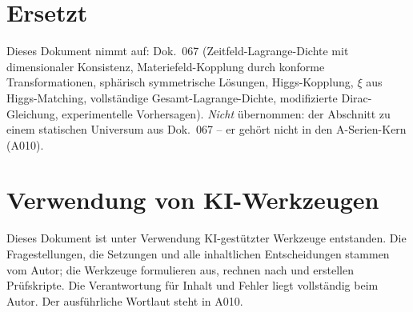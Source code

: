 \section{Ersetzt}

Dieses Dokument nimmt auf: Dok.~067 (Zeitfeld-Lagrange-Dichte mit dimensionaler
Konsistenz, Materiefeld-Kopplung durch konforme Transformationen, sphärisch
symmetrische Lösungen, Higgs-Kopplung, $\xi$ aus Higgs-Matching, vollständige
Gesamt-Lagrange-Dichte, modifizierte Dirac-Gleichung, experimentelle Vorhersagen).
\emph{Nicht} übernommen: der Abschnitt zu einem statischen Universum aus Dok.~067
-- er gehört nicht in den A-Serien-Kern (A010).

\section{Verwendung von KI-Werkzeugen}

Dieses Dokument ist unter Verwendung KI-gestützter Werkzeuge entstanden. Die
Fragestellungen, die Setzungen und alle inhaltlichen Entscheidungen stammen vom
Autor; die Werkzeuge formulieren aus, rechnen nach und erstellen Prüfskripte.
Die Verantwortung für Inhalt und Fehler liegt vollständig beim Autor. Der
ausführliche Wortlaut steht in A010.
